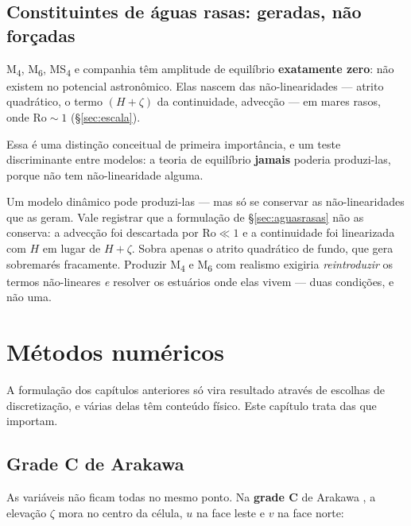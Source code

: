 \documentclass[11pt,a4paper,oneside]{report}
\theoremstyle{definition}
\theoremstyle{plain}
\theoremstyle{remark}
\begin{document}
\section{Constituintes de águas rasas: geradas, não forçadas}

M\textsubscript{4}, M\textsubscript{6}, MS\textsubscript{4} e companhia têm
amplitude de equilíbrio \textbf{exatamente zero}: não existem no potencial
astronômico. Elas nascem das não-linearidades — atrito quadrático, o termo
$(H+\zeta)$ da continuidade, advecção — em mares rasos, onde
$\mathrm{Ro}\sim 1$ (\S\ref{sec:escala}).

Essa é uma distinção conceitual de primeira importância, e um teste
discriminante entre modelos: a teoria de equilíbrio \textbf{jamais} poderia
produzi-las, porque não tem não-linearidade alguma.

Um modelo dinâmico pode produzi-las — mas só se conservar as não-linearidades
que as geram. Vale registrar que a formulação de \S\ref{sec:aguasrasas} não as
conserva: a advecção foi descartada por $\mathrm{Ro}\ll 1$ e a continuidade foi
linearizada com $H$ em lugar de $H+\zeta$. Sobra apenas o atrito quadrático de
fundo, que gera sobremarés fracamente. Produzir M\textsubscript{4} e
M\textsubscript{6} com realismo exigiria \emph{reintroduzir} os termos
não-lineares \emph{e} resolver os estuários onde elas vivem — duas condições, e
não uma.

\chapter{Métodos numéricos}
\label{cap:numerica}

A formulação dos capítulos anteriores só vira resultado através de escolhas de
discretização, e várias delas têm conteúdo físico. Este capítulo trata das que
importam.

\section{Grade C de Arakawa}
\label{sec:gradec}

As variáveis não ficam todas no mesmo ponto. Na \textbf{grade C} de Arakawa
\cite{arakawa1977}, a elevação $\zeta$ mora no centro da célula, $u$ na face
leste e $v$ na face norte:
\end{document}
